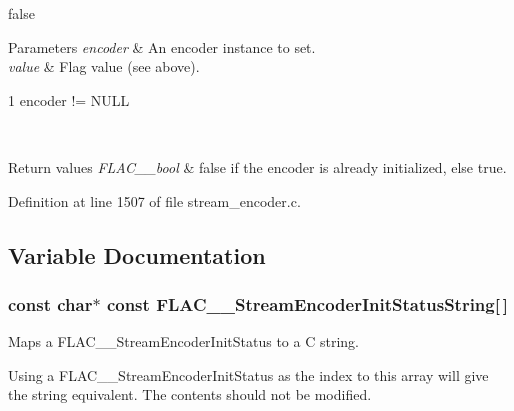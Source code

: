 {\ttfamily false} 
\begin{DoxyParams}{Parameters}
{\em encoder} & An encoder instance to set. \\
\hline
{\em value} & Flag value (see above).  
\begin{DoxyCode}
1 encoder != NULL 
\end{DoxyCode}
 \\
\hline
\end{DoxyParams}

\begin{DoxyRetVals}{Return values}
{\em F\+L\+A\+C\+\_\+\+\_\+bool} & {\ttfamily false} if the encoder is already initialized, else {\ttfamily true}. \\
\hline
\end{DoxyRetVals}


Definition at line 1507 of file stream\+\_\+encoder.\+c.



\subsection{Variable Documentation}
\subsubsection[{\texorpdfstring{F\+L\+A\+C\+\_\+\+\_\+\+Stream\+Encoder\+Init\+Status\+String}{FLAC__StreamEncoderInitStatusString}}]{ {\bf const} char$\ast$ {\bf const} F\+L\+A\+C\+\_\+\+\_\+\+Stream\+Encoder\+Init\+Status\+String\mbox{[}$\,$\mbox{]}}\hypertarget{group__flac__stream__encoder_ga05203d2cf0390dfbbc2b57b0f0b8e2df}{}\label{group__flac__stream__encoder_ga05203d2cf0390dfbbc2b57b0f0b8e2df}
Maps a F\+L\+A\+C\+\_\+\+\_\+\+Stream\+Encoder\+Init\+Status to a C string.

Using a F\+L\+A\+C\+\_\+\+\_\+\+Stream\+Encoder\+Init\+Status as the index to this array will give the string equivalent. The contents should not be modified. 

